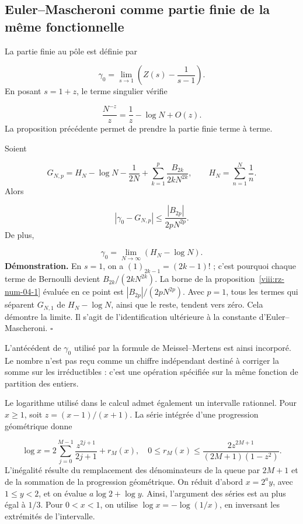 \subsection{Euler–Mascheroni comme partie finie de la même fonctionnelle}
La partie finie au pôle est définie par

\[
\gamma_0=\lim_{s\to1}\left(Z(s)-\frac1{s-1}\right).
\]
En posant \(s=1+z\), le terme singulier vérifie

\[
\frac{N^{-z}}z=\frac1z-\log N+O(z).
\]
La proposition précédente permet de prendre la partie finie terme à terme.

Soient

\[
G_{N,p}=H_N-\log N-\frac1{2N}
+\sum_{k=1}^p\frac{B_{2k}}{2kN^{2k}},
\qquad H_N=\sum_{n=1}^N\frac1n.
\]
Alors

\[
|\gamma_0-G_{N,p}|\leq\frac{|B_{2p}|}{2pN^{2p}}.
\]
De plus,

\[
\gamma_0=\lim_{N\to\infty}(H_N-\log N).
\]
\textbf{Démonstration.} En \(s=1\), on a \((1)_{2k-1}=(2k-1)!\) ; c’est pourquoi chaque terme de Bernoulli devient \(B_{2k}/(2kN^{2k})\). La borne de la proposition~\ref{viii:rz-num-04-1} évaluée en ce point est \(|B_{2p}|/(2pN^{2p})\). Avec \(p=1\), tous les termes qui séparent \(G_{N,1}\) de \(H_N-\log N\), ainsi que le reste, tendent vers zéro. Cela démontre la limite. Il s’agit de l’identification ultérieure à la constante d’Euler–Mascheroni. \hfill\(\square\)

L'antécédent de \(\gamma_0\) utilisé par la formule de Meissel–Mertens est ainsi incorporé. Le nombre n'est pas reçu comme un chiffre indépendant destiné à corriger la somme sur les irréductibles : c'est une opération spécifiée sur la même fonction de partition des entiers.

Le logarithme utilisé dans le calcul admet également un intervalle rationnel. Pour \(x\geq1\), soit \(z=(x-1)/(x+1)\). La série intégrée d’une progression géométrique donne

\[
\log x=2\sum_{j=0}^{M-1}\frac{z^{2j+1}}{2j+1}+r_M(x),
\quad
0\leq r_M(x)\leq
\frac{2z^{2M+1}}{(2M+1)(1-z^2)}.
\]
L'inégalité résulte du remplacement des dénominateurs de la queue par \(2M+1\) et de la sommation de la progression géométrique. On réduit d'abord \(x=2^a y\), avec \(1\leq y<2\), et on évalue \(a\log2+\log y\). Ainsi, l'argument des séries est au plus égal à \(1/3\). Pour \(0<x<1\), on utilise \(\log x=-\log(1/x)\), en inversant les extrémités de l'intervalle.

